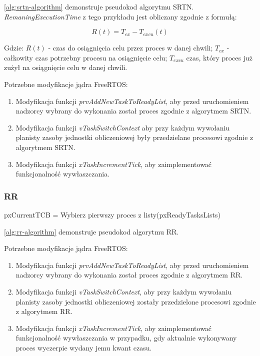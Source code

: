\documentclass[../../main]{subfiles}
\begin{document}
\cref{alg:srtn-algorithm} demonstruje pseudokod algorytmu SRTN. \textit{RemaningExecutionTime} z tego przykładu jest obliczany zgodnie z formułą:

\large
\begin{equation}
    R(t)=T_{ex}-T_{excu}(t)
    \label{eq:remaining-time}
\end{equation}
\normalsize

Gdzie: $R(t)$ - czas do osiągnięcia celu przez proces w danej chwili; $T_{ex}$ - całkowity czas potrzebny procesu na osiągnięcie celu; $T_{excu}$ czas, który  proces już zużył na osiągnięcie celu w danej chwili.

Potrzebne modyfikacje jądra FreeRTOS:

\begin{enumerate}
    \item Modyfikacja funkcji \textit{prvAddNewTaskToReadyList}, aby przed uruchomieniem nadzorcy wybrany do wykonania został proces zgodnie z algorytmem SRTN.
    \item Modyfikacja funkcji \textit{vTaskSwitchContext} aby przy każdym wywołaniu planisty zasoby jednostki obliczeniowej były przedzielane procesowi zgodnie z algorytmem SRTN.
    \item Modyfikacja funkcji \textit{xTaskIncrementTick}, aby zaimplementować funkcjonalność wywłaszczania.
\end{enumerate}

\subsubsection{RR}

\begin{algorithm}
\caption{Pseudokod algorytmu RR}\label{alg:rr-algorithm}
\begin{algorithmic}[1]
    \State pxCurrentTCB = Wybierz pierwszy proces z listy(pxReadyTasksLists)
\EndIf
\end{algorithmic}
\end{algorithm}

\cref{alg:rr-algorithm} demonstruje pseudokod algorytmu RR.

Potrzebne modyfikacje jądra FreeRTOS:

\begin{enumerate}
    \item Modyfikacja funkcji \textit{prvAddNewTaskToReadyList}, aby przed uruchomieniem nadzorcy wybrany do wykonania został proces zgodnie z algorytmem RR.
    \item Modyfikacja funkcji \textit{vTaskSwitchContext}, aby przy każdym wywołaniu planisty zasoby jednostki obliczeniowej zostały przedzielone procesowi zgodnie z algorytmem RR.
    \item Modyfikacja funkcji \textit{xTaskIncrementTick}, aby zaimplementować funkcjonalność wywłaszczania w przypadku, gdy aktualnie wykonywany proces wyczerpie wydany jemu kwant czasu.
\end{enumerate}
\end{document}
